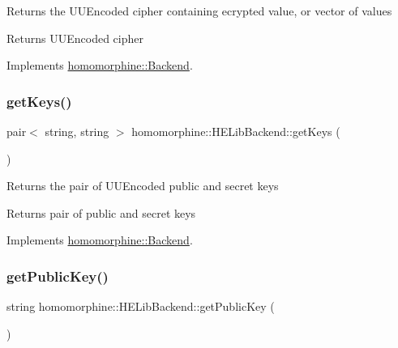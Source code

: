 Returns the U\+U\+Encoded cipher containing ecrypted value, or vector of values

\begin{DoxyReturn}{Returns}
U\+U\+Encoded cipher 
\end{DoxyReturn}


Implements \mbox{\hyperlink{classhomomorphine_1_1_backend_a6c6ed25dec9809b3f216e185e8026e97}{homomorphine\+::\+Backend}}.

\mbox{\label{classhomomorphine_1_1_h_e_lib_backend_ab45838cc01a4e71425e2aa0279e12c0e}} 
\subsubsection{\texorpdfstring{getKeys()}{getKeys()}}
{\footnotesize\ttfamily pair$<$ string, string $>$ homomorphine\+::\+H\+E\+Lib\+Backend\+::get\+Keys (\begin{DoxyParamCaption}{ }\end{DoxyParamCaption})\hspace{0.3cm}{\ttfamily [virtual]}}

Returns the pair of U\+U\+Encoded public and secret keys

\begin{DoxyReturn}{Returns}
pair of public and secret keys 
\end{DoxyReturn}


Implements \mbox{\hyperlink{classhomomorphine_1_1_backend_a4c1062db09f76c74640f70b451d70729}{homomorphine\+::\+Backend}}.

\mbox{\label{classhomomorphine_1_1_h_e_lib_backend_a8b096d4780f3b65f0fa0cb3ca6cb9ab8}} 
\subsubsection{\texorpdfstring{getPublicKey()}{getPublicKey()}}
{\footnotesize\ttfamily string homomorphine\+::\+H\+E\+Lib\+Backend\+::get\+Public\+Key (\begin{DoxyParamCaption}{ }\end{DoxyParamCaption})\hspace{0.3cm}{\ttfamily [virtual]}}

